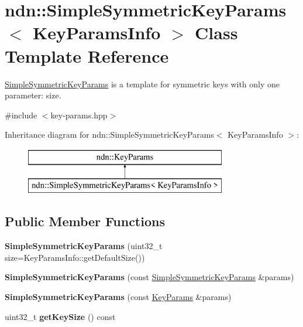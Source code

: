 \hypertarget{classndn_1_1SimpleSymmetricKeyParams}{}\section{ndn\+:\+:Simple\+Symmetric\+Key\+Params$<$ Key\+Params\+Info $>$ Class Template Reference}
\label{classndn_1_1SimpleSymmetricKeyParams}


\hyperlink{classndn_1_1SimpleSymmetricKeyParams}{Simple\+Symmetric\+Key\+Params} is a template for symmetric keys with only one parameter\+: size.  




{\ttfamily \#include $<$key-\/params.\+hpp$>$}

Inheritance diagram for ndn\+:\+:Simple\+Symmetric\+Key\+Params$<$ Key\+Params\+Info $>$\+:\begin{figure}[H]
\begin{center}
\leavevmode
\includegraphics[height=2.000000cm]{classndn_1_1SimpleSymmetricKeyParams}
\end{center}
\end{figure}
\subsection*{Public Member Functions}
\begin{DoxyCompactItemize}
\item 
{\bfseries Simple\+Symmetric\+Key\+Params} (uint32\+\_\+t size=Key\+Params\+Info\+::get\+Default\+Size())\hypertarget{classndn_1_1SimpleSymmetricKeyParams_aa19a2923676dffd51891345afe69800f}{}\label{classndn_1_1SimpleSymmetricKeyParams_aa19a2923676dffd51891345afe69800f}

\item 
{\bfseries Simple\+Symmetric\+Key\+Params} (const \hyperlink{classndn_1_1SimpleSymmetricKeyParams}{Simple\+Symmetric\+Key\+Params} \&params)\hypertarget{classndn_1_1SimpleSymmetricKeyParams_a4dc47a7f48ce289c00ff48eb54bdebf1}{}\label{classndn_1_1SimpleSymmetricKeyParams_a4dc47a7f48ce289c00ff48eb54bdebf1}

\item 
{\bfseries Simple\+Symmetric\+Key\+Params} (const \hyperlink{classndn_1_1KeyParams}{Key\+Params} \&params)\hypertarget{classndn_1_1SimpleSymmetricKeyParams_a8a90feb771d7983319215f979015c51e}{}\label{classndn_1_1SimpleSymmetricKeyParams_a8a90feb771d7983319215f979015c51e}

\item 
uint32\+\_\+t {\bfseries get\+Key\+Size} () const\hypertarget{classndn_1_1SimpleSymmetricKeyParams_adb7256b1aeb379a71bb6ccc4cbe7937b}{}\label{classndn_1_1SimpleSymmetricKeyParams_adb7256b1aeb379a71bb6ccc4cbe7937b}

\end{DoxyCompactItemize}
